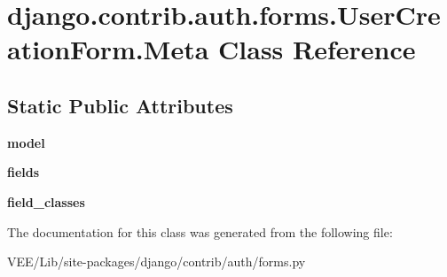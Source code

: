 \hypertarget{classdjango_1_1contrib_1_1auth_1_1forms_1_1_user_creation_form_1_1_meta}{}\section{django.\+contrib.\+auth.\+forms.\+User\+Creation\+Form.\+Meta Class Reference}
\label{classdjango_1_1contrib_1_1auth_1_1forms_1_1_user_creation_form_1_1_meta}
\subsection*{Static Public Attributes}
\begin{DoxyCompactItemize}
\item 
\mbox{\label{classdjango_1_1contrib_1_1auth_1_1forms_1_1_user_creation_form_1_1_meta_a03bffce7d241f20e2c2f1aa0997f7219}} 
{\bfseries model}
\item 
\mbox{\label{classdjango_1_1contrib_1_1auth_1_1forms_1_1_user_creation_form_1_1_meta_a40694421af668e680b98df1dde194d92}} 
{\bfseries fields}
\item 
\mbox{\label{classdjango_1_1contrib_1_1auth_1_1forms_1_1_user_creation_form_1_1_meta_a98f7d14afdb5e607555c6223a0f3cbf8}} 
{\bfseries field\+\_\+classes}
\end{DoxyCompactItemize}


The documentation for this class was generated from the following file\+:\begin{DoxyCompactItemize}
\item 
V\+E\+E/\+Lib/site-\/packages/django/contrib/auth/forms.\+py\end{DoxyCompactItemize}
